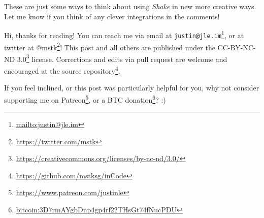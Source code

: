 \documentclass[]{article}
\renewcommand{\href}[2]{#2\footnote{\url{#1}}}
\begin{document}
These are just some ways to think about using \emph{Shake} in new more creative
ways. Let me know if you think of any clever integrations in the comments!

Hi, thanks for reading! You can reach me via email at
\href{mailto:justin@jle.im}{\nolinkurl{justin@jle.im}}, or at twitter at
\href{https://twitter.com/mstk}{@mstk}! This post and all others are published
under the \href{https://creativecommons.org/licenses/by-nc-nd/3.0/}{CC-BY-NC-ND
3.0} license. Corrections and edits via pull request are welcome and encouraged
at \href{https://github.com/mstksg/inCode}{the source repository}.

If you feel inclined, or this post was particularly helpful for you, why not
consider \href{https://www.patreon.com/justinle}{supporting me on Patreon}, or a
\href{bitcoin:3D7rmAYgbDnp4gp4rf22THsGt74fNucPDU}{BTC donation}? :)
\end{document}
